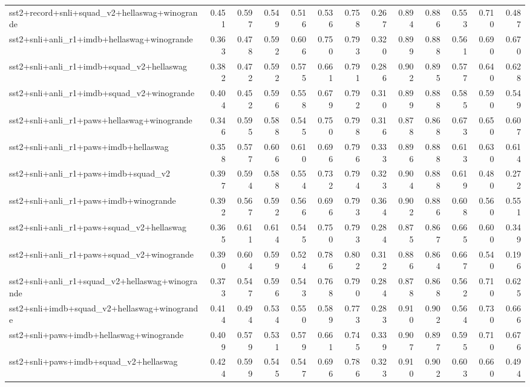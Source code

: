\begin{table}[t]
\begin{tabular}{lrrrrrrrrrrrr}
    sst2+record+snli+squad\_v2+hellaswag+winogrande & 0.451 & 0.597 & 0.549 & 0.516 & 0.536 & 0.758 & 0.267 & 0.894 & 0.886 & 0.553 & 0.710 & 0.487 \\
    sst2+snli+anli\_r1+imdb+hellaswag+winogrande & 0.363 & 0.478 & 0.592 & 0.606 & 0.750 & 0.793 & 0.320 & 0.899 & 0.888 & 0.561 & 0.690 & 0.670 \\
    sst2+snli+anli\_r1+imdb+squad\_v2+hellaswag & 0.382 & 0.472 & 0.592 & 0.575 & 0.661 & 0.791 & 0.286 & 0.902 & 0.895 & 0.577 & 0.640 & 0.628 \\
    sst2+snli+anli\_r1+imdb+squad\_v2+winogrande & 0.404 & 0.452 & 0.596 & 0.558 & 0.679 & 0.792 & 0.310 & 0.899 & 0.888 & 0.585 & 0.590 & 0.549 \\
    sst2+snli+anli\_r1+paws+hellaswag+winogrande & 0.346 & 0.595 & 0.588 & 0.545 & 0.750 & 0.798 & 0.316 & 0.878 & 0.868 & 0.673 & 0.650 & 0.607 \\
    sst2+snli+anli\_r1+paws+imdb+hellaswag & 0.358 & 0.577 & 0.606 & 0.610 & 0.696 & 0.796 & 0.333 & 0.896 & 0.888 & 0.613 & 0.630 & 0.614 \\
    sst2+snli+anli\_r1+paws+imdb+squad\_v2 & 0.397 & 0.594 & 0.588 & 0.554 & 0.732 & 0.794 & 0.323 & 0.904 & 0.888 & 0.619 & 0.480 & 0.272 \\
    sst2+snli+anli\_r1+paws+imdb+winogrande & 0.392 & 0.567 & 0.592 & 0.566 & 0.696 & 0.793 & 0.364 & 0.902 & 0.886 & 0.608 & 0.560 & 0.551 \\
    sst2+snli+anli\_r1+paws+squad\_v2+hellaswag & 0.365 & 0.611 & 0.614 & 0.545 & 0.750 & 0.793 & 0.284 & 0.875 & 0.867 & 0.665 & 0.600 & 0.349 \\
    sst2+snli+anli\_r1+paws+squad\_v2+winogrande & 0.390 & 0.604 & 0.599 & 0.524 & 0.786 & 0.802 & 0.312 & 0.886 & 0.864 & 0.667 & 0.540 & 0.196 \\
    sst2+snli+anli\_r1+squad\_v2+hellaswag+winogrande & 0.373 & 0.547 & 0.596 & 0.543 & 0.768 & 0.790 & 0.284 & 0.878 & 0.868 & 0.562 & 0.710 & 0.625 \\
    sst2+snli+imdb+squad\_v2+hellaswag+winogrande & 0.414 & 0.494 & 0.534 & 0.550 & 0.589 & 0.773 & 0.283 & 0.910 & 0.902 & 0.564 & 0.730 & 0.666 \\
    sst2+snli+paws+imdb+hellaswag+winogrande & 0.409 & 0.579 & 0.531 & 0.579 & 0.661 & 0.745 & 0.339 & 0.907 & 0.897 & 0.595 & 0.710 & 0.676 \\
    sst2+snli+paws+imdb+squad\_v2+hellaswag & 0.424 & 0.599 & 0.545 & 0.547 & 0.696 & 0.786 & 0.323 & 0.910 & 0.902 & 0.603 & 0.660 & 0.494 \\

\end{tabular}
\end{table}
